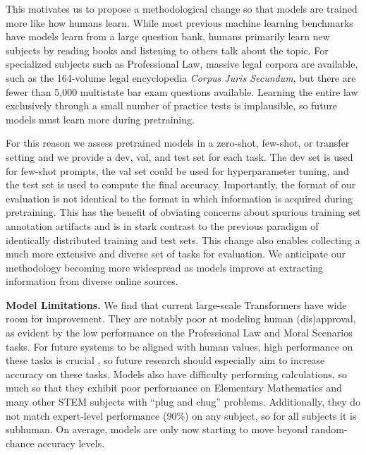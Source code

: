 \documentclass{article}
\begin{document}
This motivates us to propose a methodological change so that models are trained more like how humans learn.
While most previous machine learning benchmarks have models learn from a large question bank, humans primarily learn new subjects by reading books and listening to others talk about the topic. For specialized subjects such as Professional Law, massive legal corpora are available, such as the 164-volume legal encyclopedia \emph{Corpus Juris Secundum}, but there are fewer than 5,000 multistate bar exam questions available. Learning the entire law exclusively through a small number of practice tests is implausible, so future models must learn more during pretraining. 

For this reason we assess pretrained models in a zero-shot, few-shot, or transfer setting and we provide a dev, val, and test set for each task. The dev set is used for few-shot prompts, the val set could be used for hyperparameter tuning, and the test set is used to compute the final accuracy. Importantly, the format of our evaluation is not identical to the format in which information is acquired during pretraining. This has the benefit of obviating concerns about spurious training set annotation artifacts \citep{geirhos2020shortcut,Hendrycks2019NaturalAE} and is in stark contrast to the previous paradigm of identically distributed training and test sets. 
This change also enables collecting a much more extensive and diverse set of tasks for evaluation.
We anticipate our methodology becoming more widespread as models improve at extracting information from diverse online sources.

\noindent\textbf{Model Limitations.}\quad
We find that current large-scale Transformers have wide room for improvement. They are notably poor at modeling human (dis)approval, as evident by the low performance on the Professional Law and Moral Scenarios tasks. For future systems to be aligned with human values, high performance on these tasks is crucial \citep{hendrycks2020ethicsdataset}, so future research should especially aim to increase accuracy on these tasks. Models also have difficulty performing calculations, so much so that they exhibit poor performance on Elementary Mathematics and many other STEM subjects with ``plug and chug'' problems. Additionally, they do not match expert-level performance (90\%) on any subject, so for all subjects it is subhuman. On average, models are only now starting to move beyond random-chance accuracy levels.
\end{document}
